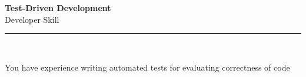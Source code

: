 \documentclass[11pt,a4paper]{memoir}
\begin{document}
    \begin{Spacing}{0.75}%
        \noindent
        \large
        \textbf{Test-Driven Development}\\[3pt]
        \scriptsize\color{gray}Developer Skill\\ 
        \rule{\textwidth}{.3mm}\\
        
        \vspace{3mm}
        \noindent
        \begin{minipage}[t]{53mm}
            \begin{flushleft}
            {
                \normalsize
                \begin{Spacing}{1}%
                \color{black}\textrm{You have experience writing automated tests for evaluating correctness of code}\\
                \end{Spacing}
            }
            \end{flushleft}
        \end{minipage}

        \vspace{5mm}
        \noindent
        \begin{minipage}[t]{53mm}
            \begin{flushleft}
            {
                \normalsize
                \begin{Spacing}{1}%
                \color{gray}\textit{}\\
                \end{Spacing}
            }
            \end{flushleft}
        \end{minipage}
    \end{Spacing}
    \clearpage
\end{document}
